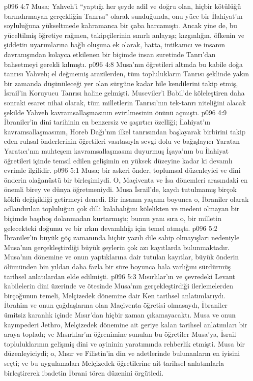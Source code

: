 \vs p096 4:7 Musa; Yahveh’i “yaptığı her şeyde adil ve doğru olan, hiçbir kötülüğü barındırmayan gerçekliğin Tanrısı” olarak sunduğunda, onu yüce bir İlahiyat’ın soyluluğuna yükseltmede kahramanca bir çaba harcamıştı. Ancak yine de, bu yüceltilmiş öğretiye rağmen, takipçilerinin sınırlı anlayışı; kızgınlığın, öfkenin ve şiddetin uyarımlarına bağlı oluşuna ek olarak, hatta, intikamcı ve insanın davranışından kolayca etkilenen bir biçimde insan suretinde Tanrı’dan bahsetmeyi gerekli kılmıştı.
\vs p096 4:8 Musa’nın öğretileri altında bu kabile doğa tanrısı Yahveh; el değmemiş arazilerden, tüm toplulukların Tanrısı şeklinde yakın bir zamanda düşünüleceği yer olan sürgüne kadar bile kendilerini takip etmiş, İsrail’in Koruyucu Tanrısı haline gelmişti. Museviler’i Babil’de köleleştiren daha sonraki esaret nihai olarak, tüm milletlerin Tanrısı’nın tek\hyp{}tanrı niteliğini alacak şekilde Yahveh kavramsallaşmasının evirilmesinin önünü açmıştı.
\vs p096 4:9 İbraniler’in dini tarihinin en benzersiz ve şaşırtıcı özelliği; İlahiyat’ın kavramsallaşmasının, Horeb Dağı’nın ilkel tanrısından başlayarak birbirini takip eden ruhsal önderlerinin öğretileri vasıtasıyla sevgi dolu ve bağışlayıcı Yaratan Yaratıcı’nın muhteşem kavramsallaşmasını duyurmuş İşaya’nın bu İlahiyat öğretileri içinde temsil edilen gelişimin en yüksek düzeyine kadar ki devamlı evrimle ilgilidir.
\vs p096 5:1 Musa; bir askeri önder, toplumsal düzenleyici ve dini önderin olağanüstü bir birleşimiydi. O, Maçiventa ve İsa dönemleri arasındaki en önemli birey ve dünya öğretmeniydi. Musa İsrail’de, kaydı tutulmamış birçok köklü değişikliği getirmeyi denedi. Bir insanın yaşamı boyunca o, İbraniler olarak adlandırılan topluluğun çok dilli kalabalığını kölelikten ve medeni olmayan bir biçimde başıboş dolanmadan kurtarmıştı; bunun yanı sıra o, bir milletin gelecekteki doğumu ve bir ırkın devamlılığı için temel atmıştı.
\vs p096 5:2 İbraniler’in büyük göç zamanında hiçbir yazılı dile sahip olmayışları nedeniyle Musa’nın gerçekleştirdiği büyük şeylerin çok azı kayıtlarda bulunmaktadır. Musa’nın dönemine ve onun yaptıklarına dair tutulan kayıtlar, büyük önderin ölümünden bin yıldan daha fazla bir süre boyunca hala varlığını sürdürmüş tarihsel anlatılardan elde edilmişti.
\vs p096 5:3 Mısırlılar’ın ve çevredeki Levant kabilelerin dini üzerinde ve ötesinde Musa’nın gerçekleştirdiği ilerlemelerden birçoğunun temeli, Melçizedek dönemine dair Ken tarihsel anlatımlarıydı. İbrahim ve onun çağdaşlarına olan Maçiventa öğretisi olmasaydı, İbraniler ümitsiz karanlık içinde Mısır’dan hiçbir zaman çıkamayacaktı. Musa ve onun kayınpederi Jethro, Melçizedek dönemine ait geriye kalan tarihsel anlatımları bir araya topladı; ve Mısırlılar’ın öğrenimine sunulan bu öğretiler Musa’ya, İsrail topluluklarının gelişmiş dini ve ayininin yaratımında rehberlik etmişti. Musa bir düzenleyiciydi; o, Mısır ve Filistin’in din ve adetlerinde bulunanların en iyisini seçti; ve bu uygulamaları Melçizedek öğretilerine ait tarihsel anlatımlarla birleştirerek ibadetin İbrani tören düzenini örgütledi.
